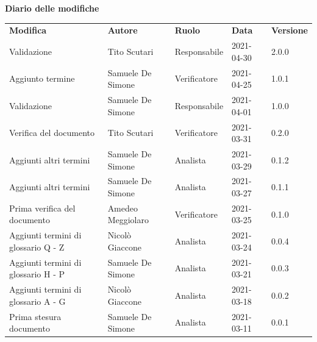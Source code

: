 \documentclass[a4paper]{article}
\begin{document}
\begin{center}
    \textbf{\Large Diario delle modifiche}\\
    \vspace{10px}
    \begin{table}[h!]
        \centering
        \renewcommand{\arraystretch}{1.8}
        \begin{tabular}{p{150px} p{90px} p{60px} p{60px} p{45px}}
            \rowcolor{logo!70} \textbf{Modifica} & \textbf{Autore}   & \textbf{Ruolo} & \textbf{Data} & \textbf{Versione} \\
            Validazione                          & Tito Scutari      & Responsabile   & 2021-04-30    & 2.0.0             \\
            Aggiunto termine                     & Samuele De Simone & Verificatore   & 2021-04-25    & 1.0.1             \\
            Validazione                          & Samuele De Simone & Responsabile   & 2021-04-01    & 1.0.0             \\
            Verifica del documento               & Tito Scutari      & Verificatore   & 2021-03-31    & 0.2.0             \\
            Aggiunti altri termini               & Samuele De Simone & Analista       & 2021-03-29    & 0.1.2             \\
            Aggiunti altri termini               & Samuele De Simone & Analista       & 2021-03-27    & 0.1.1             \\
            Prima verifica del documento         & Amedeo Meggiolaro & Verificatore   & 2021-03-25    & 0.1.0             \\
            Aggiunti termini di glossario Q - Z  & Nicolò Giaccone   & Analista       & 2021-03-24    & 0.0.4             \\
            Aggiunti termini di glossario H - P  & Samuele De Simone & Analista       & 2021-03-21    & 0.0.3             \\
            Aggiunti termini di glossario A - G  & Nicolò Giaccone   & Analista       & 2021-03-18    & 0.0.2             \\
            Prima stesura documento              & Samuele De Simone & Analista       & 2021-03-11    & 0.0.1             \\
        \end{tabular}
    \end{table}
\end{center}
\end{document}
